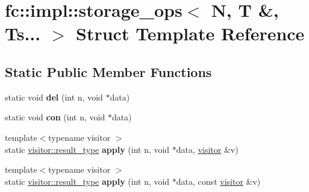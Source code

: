 \hypertarget{structfc_1_1impl_1_1storage__ops_3_01_n_00_01_t_01_6_00_01_ts_8_8_8_01_4}{}\section{fc\+:\+:impl\+:\+:storage\+\_\+ops$<$ N, T \&, Ts... $>$ Struct Template Reference}
\label{structfc_1_1impl_1_1storage__ops_3_01_n_00_01_t_01_6_00_01_ts_8_8_8_01_4}
\subsection*{Static Public Member Functions}
\begin{DoxyCompactItemize}
\item 
\mbox{\label{structfc_1_1impl_1_1storage__ops_3_01_n_00_01_t_01_6_00_01_ts_8_8_8_01_4_a5bd22292d5a5274c11546a46489b1d35}} 
static void {\bfseries del} (int n, void $\ast$data)
\item 
\mbox{\label{structfc_1_1impl_1_1storage__ops_3_01_n_00_01_t_01_6_00_01_ts_8_8_8_01_4_ae33745164f14e463eb853d7f9defd2ae}} 
static void {\bfseries con} (int n, void $\ast$data)
\item 
\mbox{\label{structfc_1_1impl_1_1storage__ops_3_01_n_00_01_t_01_6_00_01_ts_8_8_8_01_4_a21b23b55ac856f9da990b44dff0c7646}} 
{\footnotesize template$<$typename visitor $>$ }\\static \mbox{\hyperlink{struct_result}{visitor\+::result\+\_\+type}} {\bfseries apply} (int n, void $\ast$data, \mbox{\hyperlink{structfc_1_1visitor}{visitor}} \&v)
\item 
\mbox{\label{structfc_1_1impl_1_1storage__ops_3_01_n_00_01_t_01_6_00_01_ts_8_8_8_01_4_a6236b40fe1aee839128e0e5efd59cba4}} 
{\footnotesize template$<$typename visitor $>$ }\\static \mbox{\hyperlink{struct_result}{visitor\+::result\+\_\+type}} {\bfseries apply} (int n, void $\ast$data, const \mbox{\hyperlink{structfc_1_1visitor}{visitor}} \&v)
\item 

\end{DoxyCompactItemize}

